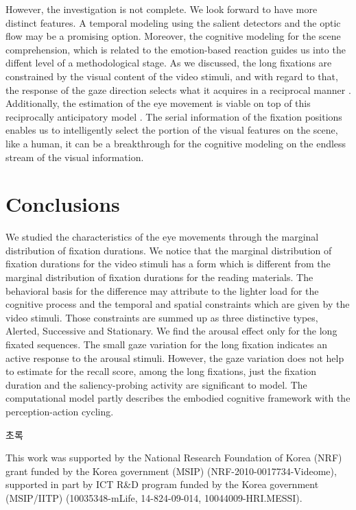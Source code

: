 \documentclass[oneside,master]{snueethesis}
\begin{document}
However, the investigation is not complete. We look forward to have more distinct features. A temporal modeling using the salient detectors \cite{marr1980,canny1986} and the optic flow \cite{koenderink1986} may be a promising option. Moreover, the cognitive modeling for the scene comprehension, which is related to the emotion-based reaction guides us into the diffent level of a methodological stage. As we discussed, the long fixations are constrained by the visual content of the video stimuli, and with regard to that, the response of the gaze direction selects what it acquires in a reciprocal manner \cite{zhang2013}. Additionally, the estimation of the eye movement is viable on top of this reciprocally anticipatory model \cite{robert1985anticipatory}. The serial information of the fixation positions enables us to intelligently select the portion of the visual features on the scene, like a human, it can be a breakthrough for the cognitive modeling on the endless stream of the visual information.


\chapter{Conclusions}

We studied the characteristics of the eye movements through the marginal distribution of fixation durations. We notice that the marginal distribution of fixation durations for the video stimuli has a form which is different from the marginal distribution of fixation durations for the reading materials. The behavioral basis for the difference may attribute to the lighter load for the cognitive process and the temporal and spatial constraints which are given by the video stimuli. Those constraints are summed up as three distinctive types, Alerted, Successive and Stationary. We find the arousal effect only for the long fixated sequences. The small gaze variation for the long fixation indicates an active response to the arousal stimuli. However, the gaze variation does not help to estimate for the recall score, among the long fixations, just the fixation duration and the saliency-probing activity are significant to model. The computational model partly describes the embodied cognitive framework with the perception-action cycling.






\begin{abstractalt}
초록
\end{abstractalt}

\acknowledgement
This work was supported by the National Research Foundation of Korea (NRF) grant funded by the Korea government (MSIP) (NRF-2010-0017734-Videome),
supported in part by ICT R\&D program funded by the Korea government (MSIP/IITP) (10035348-mLife, 14-824-09-014, 10044009-HRI.MESSI).
\end{document}
